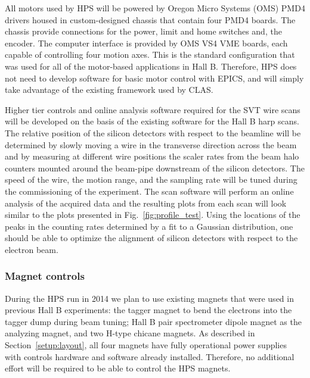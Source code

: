 All motors used by HPS  will be powered by Oregon Micro Systems (OMS) PMD4 drivers housed in custom-designed chassis 
that contain four PMD4 boards. The chassis provide connections for the power, limit and home switches and, the encoder. 
The computer interface is provided by OMS VS4 VME boards, each capable of controlling four motion axes.  
This is the standard configuration that was  used for all of the motor-based applications in Hall B. Therefore, 
HPS does not need to develop software for basic motor control with EPICS, and will simply take advantage of the existing 
framework used by CLAS.

Higher tier controls and online analysis software required for the SVT wire scans will be developed on the basis of 
the existing software for the Hall B harp scans.  
The relative position of the silicon detectors with respect to the beamline will be determined by slowly moving 
a wire in the transverse direction across the beam and by measuring at different wire positions the scaler rates from 
the beam halo counters mounted around the beam-pipe downstream of the silicon detectors. The speed of the wire, the motion 
range, and the sampling rate will be tuned during the commissioning of the experiment. The scan software will perform 
an online analysis of the acquired data and the resulting plots from each scan will look similar to the plots presented in 
Fig.~\ref{fig:profile_test}. Using the locations of the peaks in the counting rates determined by a fit to a Gaussian 
distribution, one should be able to optimize the alignment of silicon detectors with respect to the electron beam.



\subsubsection{Magnet controls}
\label{sec:ctrls:magnet}
During the HPS run in 2014 we plan to use existing magnets that were used in previous Hall B experiments: 
the tagger magnet to bend the electrons into the tagger dump during beam tuning; Hall B pair spectrometer dipole magnet 
as the analyzing magnet, and two H-type chicane magnets. As described in Section~\ref{setup:layout}, all four magnets have 
fully operational power supplies with controls hardware and software already installed. Therefore, no additional 
effort will be required to be able to control the HPS magnets.     
   



